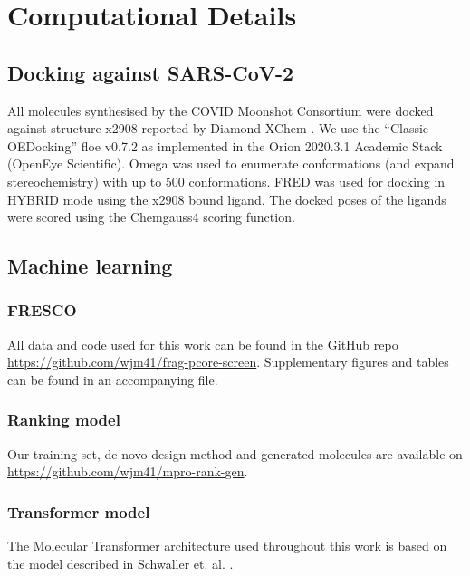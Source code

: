 \chapter{Computational Details} \label{appendix:details}

\section{Docking against SARS-CoV-2} \label{appendix:docking}
All molecules synthesised by the COVID Moonshot Consortium were docked against structure x2908 reported by Diamond XChem \cite{Douangamath2020XChem}. We use the “Classic OEDocking” floe v0.7.2 as implemented in the Orion 2020.3.1 Academic Stack (OpenEye Scientific). Omega was used to enumerate conformations (and expand stereochemistry) with up to 500 conformations. FRED was used for docking in HYBRID mode using the x2908 bound ligand. The docked poses of the ligands were scored using the Chemgauss4 scoring function.

\section{Machine learning} \label{appendix:machine_learning}
\subsection{FRESCO} \label{appendix:fresco}
All data and code used for this work can be found in the GitHub repo \url{https://github.com/wjm41/frag-pcore-screen}. Supplementary figures and tables can be found in an accompanying file.

\subsection{Ranking model} \label{appendix:ranking}
Our training set, de novo design method and generated molecules are available on \url{https://github.com/wjm41/mpro-rank-gen}.

\subsection{Transformer model} \label{appendix:transformer}
The Molecular Transformer architecture used throughout this work is based on the model described in Schwaller et. al. \cite{Schwaller2019MolecularPrediction}. 

